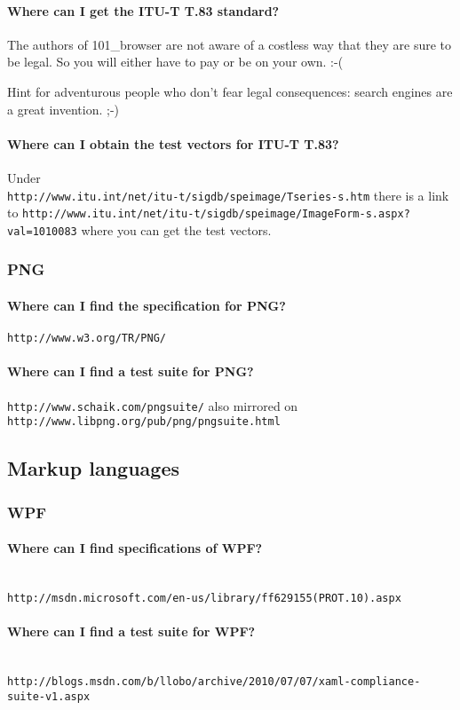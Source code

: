 \documentclass[10pt]{scrbook}
\begin{document}
\paragraph{Where can I get the ITU-T T.83 standard?} The authors of 101\_browser are not aware of a costless way that they are sure to be legal. So you will either have to pay or be on your own. :-(

Hint for adventurous people who don't fear legal consequences: search engines are a great invention. ;-)

\paragraph{Where can I obtain the test vectors for ITU-T T.83?} Under \\
\verb|http://www.itu.int/net/itu-t/sigdb/speimage/Tseries-s.htm|
there is a link to
\verb|http://www.itu.int/net/itu-t/sigdb/speimage/ImageForm-s.aspx?val=1010083|
where you can get the test vectors.

\subsubsection{PNG}

\paragraph{Where can I find the specification for PNG?} \verb|http://www.w3.org/TR/PNG/|

\paragraph{Where can I find a test suite for PNG?} \verb|http://www.schaik.com/pngsuite/| also mirrored on \verb|http://www.libpng.org/pub/png/pngsuite.html|

\subsection{Markup languages}

\subsubsection{WPF}

\paragraph{Where can I find specifications of WPF?} ~ \\
\verb|http://msdn.microsoft.com/en-us/library/ff629155(PROT.10).aspx|

\paragraph{Where can I find a test suite for WPF?} ~ \\
\verb|http://blogs.msdn.com/b/llobo/archive/2010/07/07/xaml-compliance-suite-v1.aspx|
\end{document}
